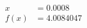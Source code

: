 \documentclass[preview]{standalone}
\begin{document}
\begin{align*}
x &= 0.0008\\f(x) &= 4.0084047
\end{align*}
\end{document}
